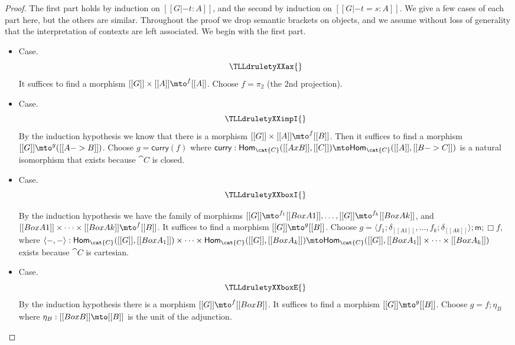\begin{proof}
  The first part holds by induction on $[[G |- t : A]]$, and the
  second by induction on $[[G |- t = s : A]]$.  We give a few cases of
  each part here, but the others are similar.  Throughout the proof we
  drop semantic brackets on objects, and we assume without loss of
  generality that the interpretation of contexts are left associated.
  We begin with the first part.

  \begin{itemize}
  \item[] Case.\\
    \[
    \TLLdruletyXXax{}
    \]
    It suffices to find a morphism $[[G]] \times [[A]] \mto^{f}
    [[A]]$.  Choose $f = \pi_2$ (the $2$nd projection).

    \item[] Case.\\
    \[
    \TLLdruletyXXimpI{}
    \]
    By the induction hypothesis we know that there is a morphism
    $[[G]] \times [[A]] \mto^f [[B]]$.  Then it suffices to find a
    morphism $[[G]] \mto^{g} ([[A -> B]])$.  Choose $g =
    \mathsf{curry}(f)$ where $\mathsf{curry} :
    \mathsf{Hom}_{\cat{C}}([[A x B]],[[C]]) \mto
    \mathsf{Hom}_{\cat{C}}([[A]],[[B -> C]])$ is a natural isomorphism
    that exists because $\cat{C}$ is closed.

  \item[] Case.\\
    \[
    \TLLdruletyXXboxI{}
    \]

    By the induction hypothesis we have the family of morphisms $[[G]]
    \mto^{f_1} [[Box A1]], \ldots, [[G]] \mto^{f_k} [[Box Ak]]$, and
    $[[Box A1]] \times \cdots \times [[Box Ak]] \mto^f [[B]]$.  It
    suffices to find a morphism $[[G]] \mto^{g} [[B]]$.  Choose $g =
    \langle f_1;\delta_{[[A1]]},\ldots,f_k;\delta_{[[Ak]]} \rangle;\mathsf{m};\Box f$, where $\langle -,-\rangle :
    \mathsf{Hom}_{\cat{C}}([[G]],[[Box A_1]]) \times \cdots \times
    \mathsf{Hom}_{\cat{C}}([[G]],[[Box A_k]]) \mto \mathsf{Hom}_{\cat{C}}([[G]],[[Box A_1]]
    \times \cdots \times [[Box A_k]])$ exists because $\cat{C}$ is cartesian.

  \item[] Case.\\
    \[
    \TLLdruletyXXboxE{}
    \]
    By the induction hypothesis there is a morphism $[[G]] \mto^f
    [[Box B]]$.  It suffices to find a morphism $[[G]] \mto^{g}
    [[B]]$.  Choose $g = f;\eta_B$ where $\eta_B : [[Box B]] \mto [[B]]$
    is the unit of the adjunction.
  \end{itemize}


\end{proof}
